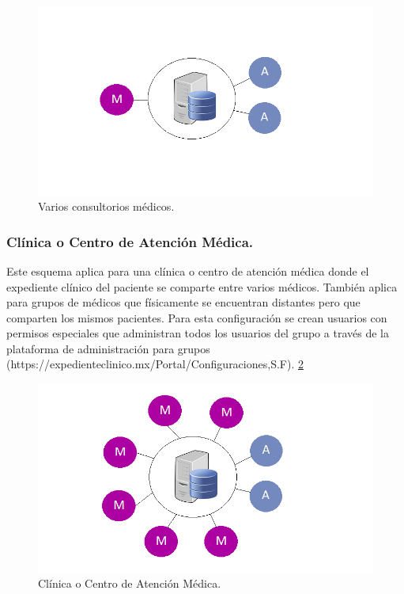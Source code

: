 \begin{figure}[h]
  \label{figura4}
  \centering
  \includegraphics[scale=.35]{lib/assets/4}
  \caption{Varios consultorios médicos.}
\end{figure}



\subsubsection{Clínica o Centro de Atención Médica.}
Este esquema aplica para una clínica o centro de atención médica donde el expediente clínico del paciente se comparte entre varios médicos. También aplica para grupos de médicos que físicamente se encuentran distantes pero que comparten los mismos pacientes. Para esta configuración se crean usuarios con permisos especiales que administran todos los usuarios del grupo a través de la plataforma de administración para grupos (https://expedienteclinico.mx/Portal/Configuraciones,S.F). \ref{figura5}

\begin{figure}[h]
  \label{figura5}
  \centering
  \includegraphics[scale=.35]{lib/assets/5}
  \caption{Clínica o Centro de Atención Médica.}
\end{figure}




